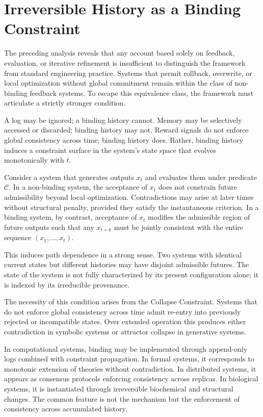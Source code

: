 \documentclass[12pt, a4paper]{article}
\theoremstyle{plain}
\theoremstyle{definition}
\theoremstyle{remark}
\begin{document}
\section{Irreversible History as a Binding Constraint}

The preceding analysis reveals that any account based solely on feedback, evaluation, or iterative refinement is insufficient to distinguish the framework from standard engineering practice. Systems that permit rollback, overwrite, or local optimization without global commitment remain within the class of non-binding feedback systems. To escape this equivalence class, the framework must articulate a strictly stronger condition.

A log may be ignored; a binding history cannot. Memory may be selectively accessed or discarded; binding history may not. Reward signals do not enforce global consistency across time; binding history does. Rather, binding history induces a constraint surface in the system's state space that evolves monotonically with $t$.

Consider a system that generates outputs $x_t$ and evaluates them under predicate $\mathcal{C}$. In a non-binding system, the acceptance of $x_t$ does not constrain future admissibility beyond local optimization. Contradictions may arise at later times without structural penalty, provided they satisfy the instantaneous criterion. In a binding system, by contrast, acceptance of $x_t$ modifies the admissible region of future outputs such that any $x_{t+k}$ must be jointly consistent with the entire sequence $(x_1, \dots, x_t)$.

This induces path dependence in a strong sense. Two systems with identical current states but different histories may have disjoint admissible futures. The state of the system is not fully characterized by its present configuration alone; it is indexed by its irreducible provenance.

The necessity of this condition arises from the Collapse Constraint. Systems that do not enforce global consistency across time admit re-entry into previously rejected or incompatible states. Over extended operation this produces either contradiction in symbolic systems or attractor collapse in generative systems.

In computational systems, binding may be implemented through append-only logs combined with constraint propagation. In formal systems, it corresponds to monotonic extension of theories without contradiction. In distributed systems, it appears as consensus protocols enforcing consistency across replicas. In biological systems, it is instantiated through irreversible biochemical and structural changes. The common feature is not the mechanism but the enforcement of consistency across accumulated history.
\end{document}
